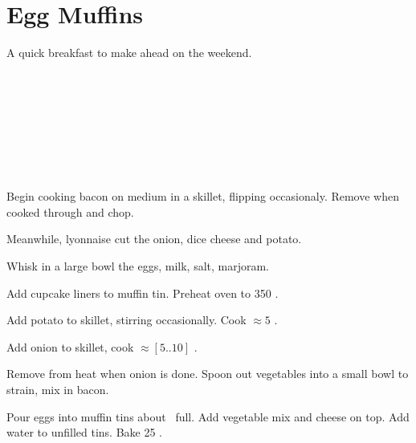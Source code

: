\section{Egg Muffins}

\begin{recipestats}[
        servings=10,
        preptime=30 \minute,
        bakingtime=25 \minute,
        source=Mike \& Jane,
    ]
\end{recipestats}

\begin{recipeabstract}
    A quick breakfast to make ahead on the weekend.
\end{recipeabstract}

\begin{ingredientcolumns}
    \begin{ingredientblock}
        \\
        \\
        \\
    \end{ingredientblock}
    \begin{ingredientblock}
        \\
        \\
        \\
    \end{ingredientblock}
\end{ingredientcolumns}

\begin{preparation}
\item Begin cooking bacon on medium in a skillet, flipping occasionaly.
    Remove when cooked through and chop.

\item Meanwhile, lyonnaise cut the onion, dice cheese and potato.

\item Whisk in a large bowl the eggs, milk, salt, marjoram.

\item Add cupcake liners to muffin tin.
    Preheat oven to 350 \Fahrenheit.

\item Add potato to skillet, stirring occasionally.
    Cook $\approx 5$ \minute.

\item Add onion to skillet, cook $\approx [5..10]$ \minute.

\item Remove from heat when onion is done.
    Spoon out vegetables into a small bowl to strain, mix in bacon.

\item Pour eggs into muffin tins about \threefourth~full.
    Add vegetable mix and cheese on top.
    Add water to unfilled tins.
    Bake 25 \minute.
\end{preparation}

\recipeend%
